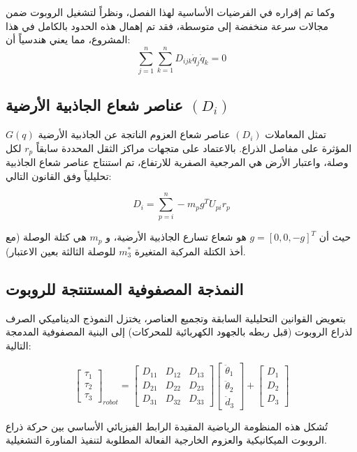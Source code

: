 وكما تم إقراره في الفرضيات الأساسية لهذا الفصل، ونظراً لتشغيل الروبوت ضمن مجالات سرعة منخفضة إلى متوسطة، فقد تم إهمال هذه الحدود بالكامل في هذا المشروع، مما يعني هندسياً أن:
\begin{equation}
\sum_{j=1}^{n} \sum_{k=1}^{n} D_{ijk}\dot{q}_j\dot{q}_k = 0
\end{equation}

\subsection{عناصر شعاع الجاذبية الأرضية $(D_i)$}
تمثل المعاملات $(D_i)$ عناصر شعاع العزوم الناتجة عن الجاذبية الأرضية $G(q)$ المؤثرة على مفاصل الذراع. بالاعتماد على متجهات مراكز الثقل المحددة سابقاً $r_p$ لكل وصلة، واعتبار الأرض هي المرجعية الصفرية للارتفاع، تم استنتاج عناصر شعاع الجاذبية تحليلياً وفق القانون التالي:

\begin{equation}
D_i = \sum_{p=i}^{n} -m_p g^T U_{pi} r_p
\label{eq:gravity_element_law}
\end{equation}

حيث أن $g = [0, 0, -g]^T$ هو شعاع تسارع الجاذبية الأرضية، و $m_p$ هي كتلة الوصلة (مع أخذ الكتلة المركبة المتغيرة $m_3^*$ للوصلة الثالثة بعين الاعتبار).

\subsection{النمذجة المصفوفية المستنتجة للروبوت}
بتعويض القوانين التحليلية السابقة وتجميع العناصر، يختزل النموذج الديناميكي الصرف لذراع الروبوت (قبل ربطه بالجهود الكهربائية للمحركات) إلى البنية المصفوفية المدمجة التالية:

\begin{equation}
\begin{bmatrix} \tau_1 \\ \tau_2 \\ \tau_3 \end{bmatrix}_{robot} = 
\begin{bmatrix} 
D_{11} & D_{12} & D_{13} \\ 
D_{21} & D_{22} & D_{23} \\ 
D_{31} & D_{32} & D_{33} 
\end{bmatrix}
\begin{bmatrix} \ddot{\theta}_1 \\ \ddot{\theta}_2 \\ \ddot{d}_3 \end{bmatrix} + 
\begin{bmatrix} D_1 \\ D_2 \\ D_3 \end{bmatrix}
\label{eq:robot_matrix_form}
\end{equation}

تُشكل هذه المنظومة الرياضية المقيدة الرابط الفيزيائي الأساسي بين حركة ذراع الروبوت الميكانيكية والعزوم الخارجية الفعالة المطلوبة لتنفيذ المناورة التشغيلية.